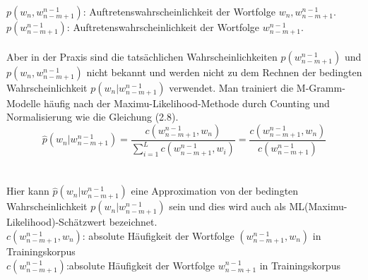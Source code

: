 $p(w_{n},w_{n-m+1}^{n-1})$: Auftretenswahrscheinlichkeit der Wortfolge $w_{n},w_{n-m+1}^{n-1}$.
$p(w_{n-m+1}^{n-1})$: Auftretenswahrscheinlichkeit der Wortfolge $w_{n-m+1}^{n-1}$.
\\
\\
Aber in der Praxis sind die tats\"achlichen Wahrscheinlichkeiten $p(w_{n-m+1}^{n-1})$  und \\ $p(w_{n},w_{n-m+1}^{n-1})$ nicht bekannt und werden nicht zu dem Rechnen der bedingten Wahrscheinlichkeit $p(w_{n}|w_{n-m+1}^{n-1})$ verwendet. Man trainiert die M-Gramm-Modelle h\"aufig nach der Maximu-Likelihood-Methode \cite{int_MLE} durch Counting und Normalisierung wie die Gleichung (2.8). 
\begin{equation}
\hat{p}(w_{n}|w_{n-m+1}^{n-1})=\frac{c(w_{n-m+1}^{n-1},w_{n} )}{ \sum_{i=1}^L c(w_{n-m+1}^{n-1},w_{i})}=\frac{c(w_{n-m+1}^{n-1},w_{n} )}{c(w_{n-m+1}^{n-1})}
\end{equation}
\\
\\
Hier kann $\hat{p}(w_{n}|w_{n-m+1}^{n-1})$  eine Approximation von der bedingten Wahrscheinlichkeit $p(w_{n}|w_{n-m+1}^{n-1})$ sein und dies wird auch als ML(Maximu-Likelihood)-Sch\"atzwert bezeichnet.\\
$c(w_{n-m+1}^{n-1},w_{n})$: absolute H\"aufigkeit der Wortfolge $(w_{n-m+1}^{n-1},w_{n})$ in Trainingskorpus\\
$c(w_{n-m+1}^{n-1})$:absolute H\"aufigkeit der Wortfolge $w_{n-m+1}^{n-1}$ in Trainingskorpus\\

